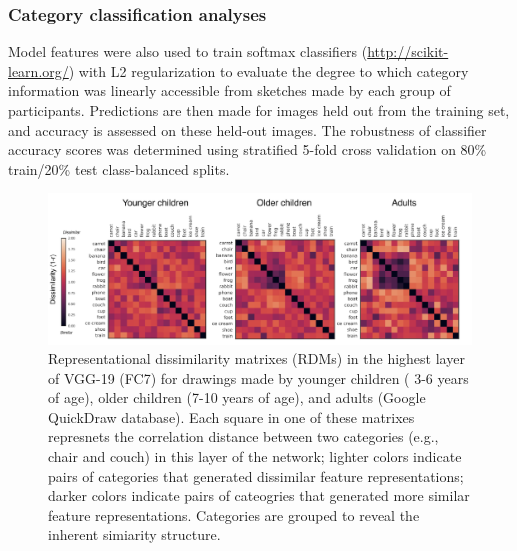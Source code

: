 \documentclass[10pt, letterpaper]{article}
\newenvironment{CodeChunk}{}{}
\begin{document}
\subsubsection{Category classification
analyses}\label{category-classification-analyses}

Model features were also used to train softmax classifiers
(\url{http://scikit-learn.org/}) with L2 regularization to evaluate the
degree to which category information was linearly accessible from
sketches made by each group of participants. Predictions are then made
for images held out from the training set, and accuracy is assessed on
these held-out images. The robustness of classifier accuracy scores was
determined using stratified 5-fold cross validation on 80\% train/20\%
test class-balanced splits.

\begin{CodeChunk}
\begin{figure}[h]

{\centering \includegraphics{figs/RSAAllCat-1} 

}

\caption[Representational dissimilarity matrixes (RDMs) in the highest layer of VGG-19 (FC7) for drawings made by younger children ( 3-6 years of age), older children (7-10 years of age), and adults (Google QuickDraw database)]{Representational dissimilarity matrixes (RDMs) in the highest layer of VGG-19 (FC7) for drawings made by younger children ( 3-6 years of age), older children (7-10 years of age), and adults (Google QuickDraw database). Each square in one of these matrixes represnets the correlation distance between two categories (e.g., chair and couch) in this layer of the network; lighter colors indicate pairs of categories that generated dissimilar feature representations; darker colors indicate pairs of cateogries that generated more similar feature representations. Categories are grouped to reveal the inherent simiarity structure.}\label{fig:RSAAllCat}
\end{figure}
\end{CodeChunk}
\end{document}

